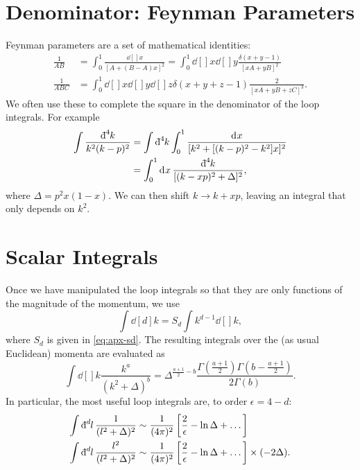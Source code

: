 \begin{appendices}
\section{Denominator: Feynman Parameters}%
\label{sec:feynman_parameters}

Feynman parameters are a set of mathematical identities:
\begin{align}
  \frac{1}{A B} &= \int_0^1 \frac{\dd[]{x}}{[A + (B - A) x]^2} = \int_0^1 \dd[]{x} \dd[]{y} \frac{\delta(x + y - 1)}{[x A + y B]^2} \\
  \frac{1}{ABC} &= \int_0^1 \dd[]{x} \dd[]{y} \dd[]{z} \delta(x + y + z - 1) \frac{2}{[xA + y B + z C]^3}.
\end{align}
We often use these to complete the square in the denominator of the loop integrals. For example
\begin{align}
  \int \frac{\bdd[4]{k}}{k^2 (k - p)^2} &= \int \bdd[4]{k} \int_0^1 \frac{\dd[]{x}}{[k^2 + [(k - p)^2 - k^2] x]^2} \\
					&= \int_0^1 \dd[]{x} \frac{\bdd[4]{k}}{[(k - xp)^2 + \Delta]^2},
\end{align}
where $\Delta = p^2 x (1 - x)$. We can then shift $k \to k + xp$, leaving an integral that only depends on $k^2$.

\section{Scalar Integrals}%
\label{sec:scalar_integrals}

Once we have manipulated the loop integrals so that they are only functions of the magnitude of the momentum, we use
\begin{equation}
  \int \dd[d]{k} = S_d \int k^{d - 1} \dd[]{k},
\end{equation}
where $S_d$ is given in \eqref{eq:apx-sd}.
The resulting integrals over the (as usual Euclidean) momenta are evaluated as
\begin{equation}
  \int \dd[]{k} \frac{k^a}{(k^2 + \Delta)^b} = \Delta^{\frac{a + 1}{2} - b} \frac{\Gamma \left( \frac{a + 1}{2} \right) \Gamma \left( b - \frac{a + 1}{2} \right)}{2 \Gamma(b)}.
\end{equation}
In particular, the most useful loop integrals are, to order $\epsilon = 4 - d$:
\begin{subequations}
  \label{eq:loop-identities}
  \begin{align}
    \int \bdd[d]{l} \frac{1}{(l^2 + \Delta)^2} & \sim \frac{1}{(4 \pi)^{2}} \left[ \frac{2}{\epsilon} - \ln \Delta + \dots \right] \\
      \int \bdd[d]{l} \frac{l^2}{(l^2 + \Delta)^2} & \sim \frac{1}{(4\pi)^2} \left[ \frac{2}{\epsilon} - \ln \Delta + \dots \right] \times (-2 \Delta).
  \end{align}
\end{subequations}


\end{appendices}
